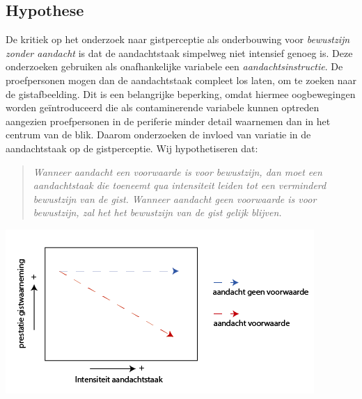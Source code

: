 \documentclass[a0,portrait]{a0poster}
\begin{document}
\begin{multicols}{3}
\section*{Hypothese}
De kritiek op het onderzoek naar gistperceptie als onderbouwing voor \textit{bewustzijn zonder aandacht} is dat de aandachtstaak simpelweg niet intensief genoeg is\cite{Cohen_Alvarez_Nakayama_2011, Mack_Clarke_2012}. Deze onderzoeken gebruiken als onafhankelijke variabele een \textit{aandachtsinstructie}. De proefpersonen mogen dan de aandachtstaak compleet los laten, om te zoeken naar de gistafbeelding. Dit is een belangrijke beperking, omdat hiermee oogbewegingen worden ge\"introduceerd die als contaminerende variabele kunnen optreden aangezien proefpersonen in de periferie minder detail waarnemen dan in het centrum van de blik\cite{moore2013clinically}. Daarom onderzoeken de invloed van variatie in de aandachtstaak op de gistperceptie. Wij hypothetiseren dat:
\begin{quote}
\textit{Wanneer aandacht een voorwaarde is voor bewustzijn, dan moet een aandachtstaak die toeneemt qua intensiteit leiden tot een verminderd bewustzijn van de gist. Wanneer aandacht geen voorwaarde is voor bewustzijn, zal het het bewustzijn van de gist gelijk blijven.}
\end{quote}
\begin{center}\vspace{1cm}
\includegraphics[width=1.0\linewidth]{illustratieHypothese.png}
\end{center}%

\end{multicols}
\end{document}
